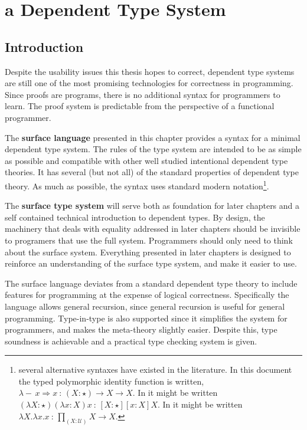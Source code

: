 \chapter{a Dependent Type System}
\label{chapter:Surface}
\thispagestyle{myheadings}

\section{Introduction}

Despite the usability issues this thesis hopes to correct, dependent type systems are still one of the most promising technologies for correctness in programming.
Since proofs are programs, there is no additional syntax for programmers to learn.
The proof system is predictable from the perspective of a functional programmer. 

The \textbf{surface language} presented in this chapter provides a syntax for a minimal dependent type system.
The rules of the type system are intended to be as simple as possible and compatible with other well studied intentional dependent type theories.
It has several (but not all) of the standard properties of dependent type theory.
As much as possible, the syntax uses standard modern notation\footnote{
  several alternative syntaxes have existed in the literature.
  In this document the typed polymorphic identity function is written, $\lambda-\,x\Rightarrow x\ :\,\left(X:\star\right)\rightarrow X\rightarrow X$.
  In \cite{10.1016/0890-5401(88)90005-3} it might be written $\left(\lambda X:\star\right)\left(\lambda x:X\right)x\ :\,\left[X:\star\right]\left[x:X\right]X$.
  In \cite{HoTTbook} it might be written $\lambda X.\lambda x.x\ :\,\underset{\left(X:\mathcal{U}\right)}{\prod}X\rightarrow X$.}.

The \textbf{surface type system} will serve both as foundation for later chapters and a self contained technical introduction to dependent types.
By design, the machinery that deals with equality addressed in later chapters should be invisible to programers that use the full system.
Programmers should only need to think about the surface system.
Everything presented in later chapters is designed to reinforce an understanding of the surface type system, and make it easier to use.

The surface language deviates from a standard dependent type theory to include features for programming at the expense of logical correctness.
Specifically the language allows general recursion, since general recursion is useful for general programming.
Type-in-type is also supported since it simplifies the system for programmers, and makes the meta-theory slightly easier.
Despite this, type soundness is achievable and a practical type checking system is given.

